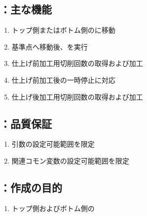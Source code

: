 \clearpage
\subsection{\KOutcutRLeft：主な機能}
\begin{enumerate}[label*=\sarrow]
\item トップ側またはボトム側の\OutcutMillingReferencePoint に移動
\item 基準点へ移動後、\KOLeftFS を実行
\item 仕上げ前加工用切削回数の取得および加工
\item 仕上げ前加工後の一時停止\OpauseCheck に対応
\item 仕上げ後加工用切削回数の取得および加工
\end{enumerate}


\subsection{\KEndFaceRight：品質保証}
\begin{enumerate}[label*=\sarrow]
\item {}引数の設定可能範囲を限定
\item 関連コモン変数の設定可能範囲を限定
\end{enumerate}



\clearpage


\subsection{\KCurvedOutcutRLeft：作成の目的}
\begin{enumerate}[label*=\sarrow]
\item トップ側およびボトム側の\CurvedOutcutMilling
\end{enumerate}


